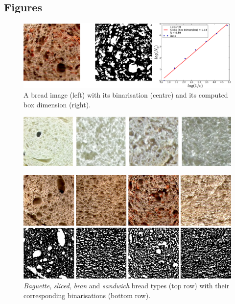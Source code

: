 \documentclass[twocolumn]{bmcart}%
\begin{document}
\begin{backmatter}

\section*{Figures}
\begin{figure}[h!]
\centering
\includegraphics{Fig1}
\caption{
A bread image (left) with its binarisation (centre) and its computed box dimension (right).}
\label{fig:fitbox}
\end{figure}

\begin{figure}[h!]
\centering
\includegraphics{Fig2}
\caption{}
\label{fig:camera}
\end{figure}

\begin{figure}[h!]
\centering
\includegraphics{Fig3}
\caption{ {\em Baguette}, {\em sliced}, {\em bran} and {\em sandwich} bread types (top row) with their corresponding binarisations (bottom row).}
\label{fig:bread}
\end{figure}


\end{backmatter}
\end{document}
